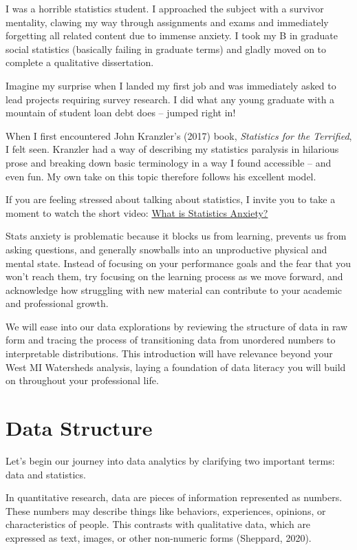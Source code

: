 \documentclass[
  letterpaper,
  DIV=11,
  numbers=noendperiod]{scrreprt}
\begin{document}
I was a horrible statistics student. I approached the subject with a
survivor mentality, clawing my way through assignments and exams and
immediately forgetting all related content due to immense anxiety. I
took my B in graduate social statistics (basically failing in graduate
terms) and gladly moved on to complete a qualitative dissertation.

Imagine my surprise when I landed my first job and was immediately asked
to lead projects requiring survey research. I did what any young
graduate with a mountain of student loan debt does -- jumped right in!

When I first encountered John Kranzler's (2017) book, \emph{Statistics
for the Terrified}, I felt seen. Kranzler had a way of describing my
statistics paralysis in hilarious prose and breaking down basic
terminology in a way I found accessible -- and even fun. My own take on
this topic therefore follows his excellent model.

If you are feeling stressed about talking about statistics, I invite you
to take a moment to watch the short video:
\href{https://youtu.be/iymgY56mgCo?si=4t7mUiiaIKp-mhCh}{What is
Statistics Anxiety?}

Stats anxiety is problematic because it blocks us from learning,
prevents us from asking questions, and generally snowballs into an
unproductive physical and mental state. Instead of focusing on your
performance goals and the fear that you won't reach them, try focusing
on the learning process as we move forward, and acknowledge how
struggling with new material can contribute to your academic and
professional growth.

We will ease into our data explorations by reviewing the structure of
data in raw form and tracing the process of transitioning data from
unordered numbers to interpretable distributions. This introduction will
have relevance beyond your West MI Watersheds analysis, laying a
foundation of data literacy you will build on throughout your
professional life.

\section{Data Structure}\label{data-structure}

Let's begin our journey into data analytics by clarifying two important
terms: data and statistics.

In quantitative research, data are pieces of information represented as
numbers. These numbers may describe things like behaviors, experiences,
opinions, or characteristics of people. This contrasts with qualitative
data, which are expressed as text, images, or other non-numeric forms
(Sheppard, 2020).
\end{document}
